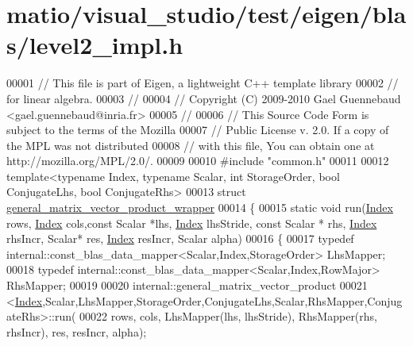 \hypertarget{matio_2visual__studio_2test_2eigen_2blas_2level2__impl_8h_source}{}\section{matio/visual\+\_\+studio/test/eigen/blas/level2\+\_\+impl.h}
\label{matio_2visual__studio_2test_2eigen_2blas_2level2__impl_8h_source}

\begin{DoxyCode}
00001 \textcolor{comment}{// This file is part of Eigen, a lightweight C++ template library}
00002 \textcolor{comment}{// for linear algebra.}
00003 \textcolor{comment}{//}
00004 \textcolor{comment}{// Copyright (C) 2009-2010 Gael Guennebaud <gael.guennebaud@inria.fr>}
00005 \textcolor{comment}{//}
00006 \textcolor{comment}{// This Source Code Form is subject to the terms of the Mozilla}
00007 \textcolor{comment}{// Public License v. 2.0. If a copy of the MPL was not distributed}
00008 \textcolor{comment}{// with this file, You can obtain one at http://mozilla.org/MPL/2.0/.}
00009 
00010 \textcolor{preprocessor}{#include "common.h"}
00011 
00012 \textcolor{keyword}{template}<\textcolor{keyword}{typename} Index, \textcolor{keyword}{typename} Scalar, \textcolor{keywordtype}{int} StorageOrder, \textcolor{keywordtype}{bool} ConjugateLhs, \textcolor{keywordtype}{bool} ConjugateRhs>
00013 \textcolor{keyword}{struct }\hyperlink{structgeneral__matrix__vector__product__wrapper}{general\_matrix\_vector\_product\_wrapper}
00014 \{
00015   \textcolor{keyword}{static} \textcolor{keywordtype}{void} run(\hyperlink{namespace_eigen_a62e77e0933482dafde8fe197d9a2cfde}{Index} rows, \hyperlink{namespace_eigen_a62e77e0933482dafde8fe197d9a2cfde}{Index} cols,\textcolor{keyword}{const} Scalar *lhs, \hyperlink{namespace_eigen_a62e77e0933482dafde8fe197d9a2cfde}{Index} lhsStride, \textcolor{keyword}{const} Scalar *
      rhs, \hyperlink{namespace_eigen_a62e77e0933482dafde8fe197d9a2cfde}{Index} rhsIncr, Scalar* res, \hyperlink{namespace_eigen_a62e77e0933482dafde8fe197d9a2cfde}{Index} resIncr, Scalar alpha)
00016   \{
00017     \textcolor{keyword}{typedef} internal::const\_blas\_data\_mapper<Scalar,Index,StorageOrder> LhsMapper;
00018     \textcolor{keyword}{typedef} internal::const\_blas\_data\_mapper<Scalar,Index,RowMajor> RhsMapper;
00019     
00020     internal::general\_matrix\_vector\_product
00021         <\hyperlink{namespace_eigen_a62e77e0933482dafde8fe197d9a2cfde}{Index},Scalar,LhsMapper,StorageOrder,ConjugateLhs,Scalar,RhsMapper,ConjugateRhs>::run(
00022         rows, cols, LhsMapper(lhs, lhsStride), RhsMapper(rhs, rhsIncr), res, resIncr, alpha);

\end{DoxyCode}
